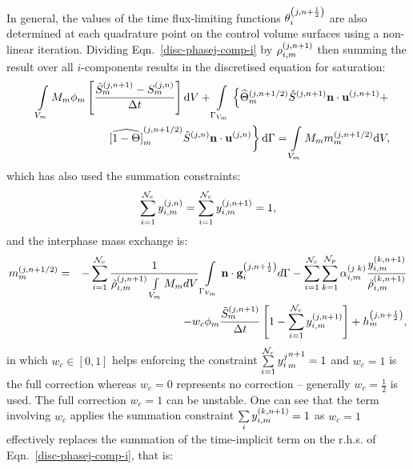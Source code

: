 In general, the values of the time flux-limiting functions $\mfr[\theta]{i}{j,n+\frac{1}{2}}$ are also determined at each quadrature point on the control volume surfaces using a non-linear iteration. Dividing Eqn.~\ref{disc-phasej-comp-i} by $\mfr[\rho]{i,m}{j,n+1}$ then summing the result over all $i$-components results in the discretised equation for saturation: 
\begin{eqnarray}
    && \int\limits_{V_m} M_{m} \phi_{m} \left[ \frc{\mfr[\tilde{S}]{m}{j,n+1} - \mfr[S]{m}{j,n}}{\Delta t} \right]\d V + 
       \int\limits_{\Gamma_{V_m}} \left\{ \mfr[\widehat{\Theta}]{m}{j, n+1/2} \mfr[\hat{S}]{}{j, n+1}\mathbf{n}\cdot \mfr[\mathbf{u}]{}{j, n+1} + \right.\nonumber \\
    && \left. \mfr[\widehat{\left[1-\Theta\right]}]{m}{j, n+1/2}\mfr[\hat{S}]{}{j, n}\mathbf{n}\cdot \mfr[\mathbf{u}]{}{j, n}\right\}\d\Gamma 
       = \int\limits_{V_m} M_{m} \mfr[m]{m}{j, n+1/2} \d V ,\label{disc-phasej-sat-i}
\end{eqnarray}
which has also used the summation constraints:  
\begin{equation}
   \summation_{i=1}^{\mathcal{N}_c} \mfr[y]{i,m}{j, n} = \summation_{i=1}^{\mathcal{N}_c}\mfr[y]{i,m}{j,n+1}=1,  \label{sum-constraint} 
\end{equation}
and the interphase mass exchange is:
\begin{eqnarray}
   \mfr[m]{m}{j, n+1/2} &=& -\summation_{i=1}^{{\cal N}_c} \frc{1}{ \mfr[\tilde{\rho}]{i,m}{j, n+1} \int\limits_{V_m}M_m dV} \int\limits_{\Gamma_{V_m}}  \mathbf{n}\cdot\mfr[\mathbf{g}]{i}{j,n+\frac{1}{2}}d\Gamma -\summation_{i=1}^{{\cal N}_c} \summation_{k=1}^{{\cal N}_p} \mfr[\alpha]{i,m}{j\;k} \frc{\mfr[y]{i,m}{k, n+1}}{\mfr[\tilde{\rho}]{i,m}{k, n+1}} \nonumber \\
                        && -w_c \phi_m\frc{\mfr[\tilde{S}]{m}{j, n+1}}{\Delta t} \left[1- \summation_{i=1}^{{\cal N}_c} \mfr[y]{i,m}{j,n+1} \right] + \mfr[h]{m}{j, n+\frac{1}{2}},\label{disc-mass-exchange}
\end{eqnarray}
in which  $w_c\in [0, 1]$ helps enforcing the constraint $\summation_{i=1}^{{\cal N}_c} {y_{i}^{j}}_m^{n+1}=1$ and $w_c=1$ is the full correction whereas $w_c=0$ represents no correction -- generally $w_c=\frac{1}{2}$ is used. The full correction $w_c=1$ can be unstable. One can see that the term involving $w_c$ applies the summation constraint $\summation_i \mfr[y]{i,m}{k, n+1}=1$ as $w_c=1$ effectively replaces the summation of the time-implicit term on the r.h.s. of Eqn.~\ref{disc-phasej-comp-i}, that is:
